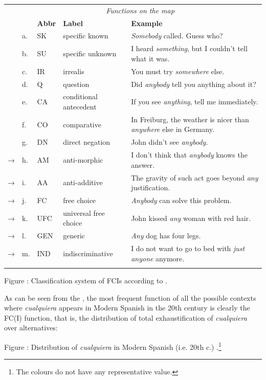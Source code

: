 \begin{table}
\begin{tabularx}{\textwidth}{XXXXX}
 & \multicolumn{4}{c}{\textit{Functions on the map}}\\
\lsptoprule
&  & \textbf{Abbr} & \textbf{Label} & \textbf{Example}\\
& a. & SK & specific known & \textit{Somebody} called. Guess who?\\
& b. & SU & specific unknown & I heard \textit{something}, but I couldn’t tell what it was.\\
& c. & IR & irrealis & You must try \textit{somewhere} else.\\
& d. & Q & question & Did \textit{anybody} tell you anything about it?\\
& e. & CA & conditional antecedent & If you see \textit{anything}, tell me immediately.\\
& f. & CO & comparative & In Freiburg, the weather is nicer than \textit{anywhere} else in Germany.\\
& g. & DN & direct negation & John didn’t see \textit{anybody}.\\
→ & h. & AM & anti-morphic & I don’t think that \textit{anybody} knows the answer.\\
→ & i. & AA & anti-additive & The gravity of such act goes beyond \textit{any} justification.\\
→ & j. & FC & free choice & \textit{Anybody} can solve this problem.\\
→ & k. & UFC & universal free choice & John kissed \textit{any} woman with red hair.\\
→ & l. & GEN & generic & \textit{Any} dog has four legs.\\
→ & m. & IND & indiscriminative & I do not want to go to bed with \textit{just anyone} anymore.\\
\lspbottomrule
\end{tabularx}
Figure : Classification system of FCIs according to \citet{AloniEtAl2010}.
\end{table}

As can be seen from the , the most frequent function of all the possible contexts where \textit{cualquiera} appears in Modern Spanish in the 20th century is clearly the FC(I) function, that is, the distribution of total exhaustification of \textit{cualquiera} over alternatives:

  
\begin{table}


Figure : Distribution of \textit{cualquiera} in Modern Spanish (i.e. 20th c.) \citet[19]{AloniEtAl2010}.\footnote{{The colours do not have any representative value.}}
\end{table}

